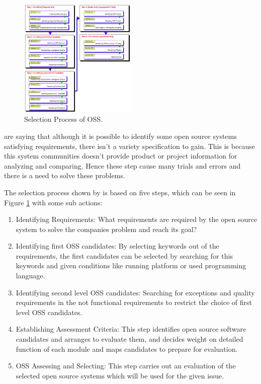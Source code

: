 \documentclass[DIV=calc,paper=a4,fontsize=9pt,twocolumn]{scrartcl}
\begin{document}
\begin{figure}[ht]
    \includegraphics[width=0.5\textwidth ]{img/selectionprocess.png}{}
    \centering
    \caption{Selection Process of OSS. \citet{lee2007study}}\label{fig:selection-process.png}
\end{figure}


\citet{lee2007study} are saying that although it is possible to identify some open source systems satisfying requirements, there isn't a variety specification to gain. This is because this system communities doesn't provide product or project information for analyzing and comparing. Hence these step cause many trials and errors and there is a need to solve these problems.


The selection process shown by \citet{lee2007study} is based on five steps, which can be seen in Figure \ref{fig:selection-process.png} with some sub actions:

\begin{enumerate}
    \item Identifying Requirements: What requirements are required by the open source system to solve the companies problem and reach its goal?
    \item Identifying first OSS candidates: By selecting keywords out of the requirements, the first candidates can be selected by searching for this keywords and given conditions like running platform or used programming language.
    \item Identifying second level OSS candidates: Searching for exceptions and quality requirements in the not functional requirements to restrict the choice of first level OSS candidates.
    \item Establishing Assessment Criteria: This step identifies open source software candidates and arranges to evaluate them, and decides weight on detailed function of each module and maps candidates to prepare for evaluation.
    \item OSS Assessing and Selecting: This step carries out an evaluation of the selected open source systems which will be used for the given issue. 
\end{enumerate}
\end{document}
